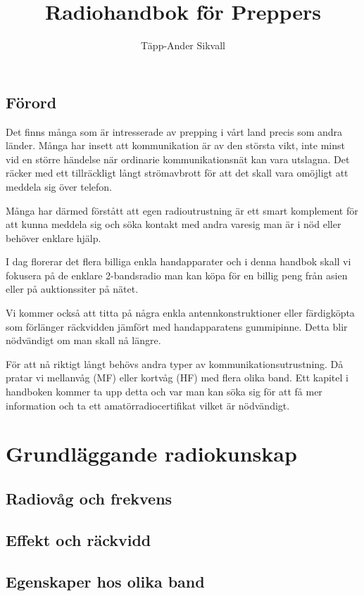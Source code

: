 \documentclass[12pt,swedish,a4paper,twoside]{report}
\begin{document}
\title{Radiohandbok för Preppers}
\author{Täpp-Ander Sikvall}
\maketitle

\section*{Förord}

Det finns många som är intresserade av prepping i vårt land precis som andra länder. Många har insett att kommunikation är av den största vikt, inte minst vid en större händelse när ordinarie kommunikationsnät kan vara utslagna. Det räcker med ett tillräckligt långt strömavbrott för att det skall vara omöjligt att meddela sig över telefon.

Många har därmed förstått att egen radioutrustning är ett smart komplement för att kunna meddela sig och söka kontakt med andra varesig man är i nöd eller behöver enklare hjälp.

I dag florerar det flera billiga enkla handapparater och i denna handbok skall vi fokusera på de enklare 2-bandsradio man kan köpa för en billig peng från asien eller på auktionssiter på nätet.

Vi kommer också att titta på några enkla antennkonstruktioner eller färdigköpta som förlänger räckvidden jämfört med handapparatens gummipinne. Detta blir nödvändigt om man skall nå längre.

För att nå riktigt långt behövs andra typer av kommunikationsutrustning. Då pratar vi mellanvåg (MF) eller kortvåg (HF) med flera olika band. Ett kapitel i handboken kommer ta upp detta och var man kan söka sig för att få mer information och ta ett amatörradiocertifikat vilket är nödvändigt.

\chapter{Grundläggande radiokunskap}

\section{Radiovåg och frekvens}

\section{Effekt och räckvidd}

\section{Egenskaper hos olika band}
\end{document}

